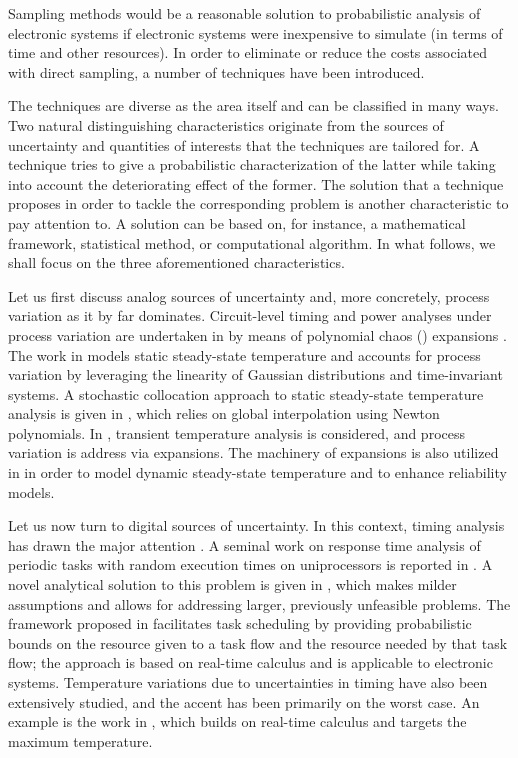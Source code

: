 Sampling methods would be a reasonable solution to probabilistic analysis of
electronic systems if electronic systems were inexpensive to simulate (in terms
of time and other resources). In order to eliminate or reduce the costs
associated with direct sampling, a number of techniques have been introduced.

The techniques are diverse as the area itself and can be classified in many
ways. Two natural distinguishing characteristics originate from the sources of
uncertainty and quantities of interests that the techniques are tailored for. A
technique tries to give a probabilistic characterization of the latter while
taking into account the deteriorating effect of the former. The solution that a
technique proposes in order to tackle the corresponding problem is another
characteristic to pay attention to. A solution can be based on, for instance, a
mathematical framework, statistical method, or computational algorithm. In what
follows, we shall focus on the three aforementioned characteristics.

Let us first discuss analog sources of uncertainty and, more concretely, process
variation as it by far dominates. Circuit-level timing and power analyses under
process variation are undertaken in \cite{bhardwaj2008} by means of polynomial
chaos () expansions \cite{xiu2010}. The work in \cite{juan2012} models
static steady-state temperature and accounts for process variation by leveraging
the linearity of Gaussian distributions and time-invariant systems. A stochastic
collocation \cite{xiu2010} approach to static steady-state temperature analysis
is given in \cite{lee2013}, which relies on global interpolation using Newton
polynomials. In \cite{ukhov2014}, transient temperature analysis is considered,
and process variation is address via  expansions. The machinery of
 expansions is also utilized in \cite{ukhov2015} in order to model
dynamic steady-state temperature \cite{ukhov2012} and to enhance reliability
models.

Let us now turn to digital sources of uncertainty. In this context, timing
analysis has drawn the major attention \cite{quinton2012}. A seminal work on
response time analysis of periodic tasks with random execution times on
uniprocessors is reported in \cite{diaz2002}. A novel analytical solution to
this problem is given in \cite{tanasa2015}, which makes milder assumptions and
allows for addressing larger, previously unfeasible problems. The framework
proposed in \cite{santinelli2011} facilitates task scheduling by providing
probabilistic bounds on the resource given to a task flow and the resource
needed by that task flow; the approach is based on real-time calculus and is
applicable to electronic systems. Temperature variations due to uncertainties in
timing have also been extensively studied, and the accent has been primarily on
the worst case. An example is the work in \cite{yang2013}, which builds on
real-time calculus and targets the maximum temperature.


